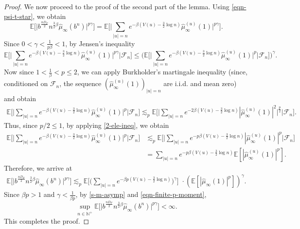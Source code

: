\documentclass[12pt]{amsart}
\theoremstyle{definition}
\theoremstyle{remark}
\newcommand{\N}{\mathbb{N}}
\newcommand{\E}{\mathbb{E}}
\numberwithin{equation}{section}
\begin{document}
\begin{proof}
We now proceed to the proof of the second part of the lemma. Using \eqref{eqn-psi-t-star}, we obtain
\[
\E\Big[\big| b^{\frac{n D_F}{2}}   n^{\frac{3}{2}\beta} \widehat{\mu}_{\infty}\left(b^n\right)\big|^{p\gamma}\Big] =   \E\Big[ \Big|     \sum_{|u|=n} e^{-\beta ( V(u)-\frac{3}{2}\log n )}\widehat{\mu}_{\infty}^{(u)}(1)  \Big|^{p\gamma}   \Big]. 
\]
Since $0< \gamma< \frac{1}{p\beta}< 1$,  by Jensen's inequality 
\[
\E\Big[ \Big|     \sum_{|u|=n} e^{-\beta ( V(u)-\frac{3}{2}\log n )}\widehat{\mu}_{\infty}^{(u)}(1)  \Big|^{p\gamma}   \Big|\mathscr{F}_n\Big]  \le   \Big( \E\Big[ \Big|     \sum_{|u|=n} e^{-\beta ( V(u)-\frac{3}{2}\log n )}\widehat{\mu}_{\infty}^{(u)}(1)  \Big|^{p}   \Big|\mathscr{F}_n\Big] \Big)^\gamma.
\]
Now since  $1< \frac{1}{\beta}< p\le 2$, we can apply Burkholder's martingale  inequality  (since, conditioned on $\mathscr{F}_n$, the sequence  $(\widehat{\mu}_{\infty}^{(u)}(1))_{|u|=n}$ are i.i.d. and mean zero) and obtain 
\begin{align*}
\E\Big[ \Big|     \sum_{|u|=n} e^{-\beta ( V(u)-\frac{3}{2}\log n )}\widehat{\mu}_{\infty}^{(u)}(1)  \Big|^{p}   \Big|\mathscr{F}_n\Big]   \lesssim_p   \E\Big[ \Big|     \sum_{|u|=n} e^{-2 \beta ( V(u)-\frac{3}{2}\log n )}|\widehat{\mu}_{\infty}^{(u)}(1)|^2  \Big|^{\frac{p}{2}}   \Big|\mathscr{F}_n\Big]. 
\end{align*}
Thus, since $p/2\le 1$,  by applying \eqref{2-ele-ineq}, we obtain 
\begin{align*}
\E\Big[ \Big|     \sum_{|u|=n} e^{-\beta ( V(u)-\frac{3}{2}\log n )}\widehat{\mu}_{\infty}^{(u)}(1)  \Big|^{p}   \Big|\mathscr{F}_n\Big]   & \lesssim_p   \E\Big[ \Big|     \sum_{|u|=n} e^{- p \beta ( V(u)-\frac{3}{2}\log n )}|\widehat{\mu}_{\infty}^{(u)}(1)|^{p}  \Big|\mathscr{F}_n\Big] 
\\
& =        \sum_{|u|=n} e^{- p \beta ( V(u)-\frac{3}{2}\log n )} \E[ |\widehat{\mu}_{\infty}^{(u)}(1)|^{p}].  
\end{align*}
Therefore, we arrive at 
\begin{align*}
\E\Big[\big| b^{\frac{n D_F}{2}}   n^{\frac{3}{2}\beta} \widehat{\mu}_{\infty}\left(b^n\right)\big|^{p\gamma}\Big]\lesssim_p  \E\Big[\Big(\sum_{|u|=n} e^{-\beta p ( V(u)-\frac{3}{2}\log n )}\Big)^{\gamma}\Big]\,\,\cdot(\E[|\widehat{\mu}_{\infty}(1)|^p])^\gamma.
\end{align*}
Since   $\beta p>1$ and $\gamma<\frac{1}{\beta p}$, by  \eqref{s-m-asymp} and  \eqref{eqn-finite-p-moment}, 
\[
\sup_{n\in\N^+}\E\Big[\big| b^{\frac{n D_F}{2}}   n^{\frac{3}{2}\beta} \widehat{\mu}_{\infty}\left(b^n\right) \big|^{p\gamma}\Big]<\infty.
\]
This completes the proof.
\end{proof}
\end{document}
